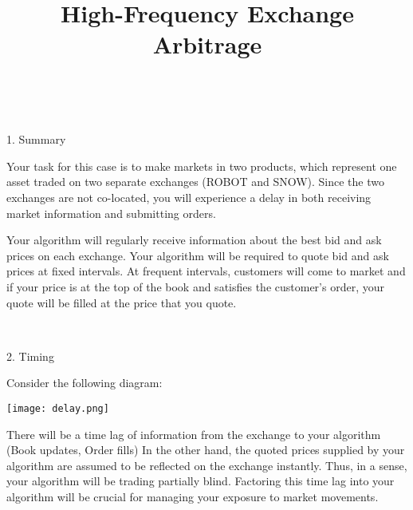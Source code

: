 \documentclass[12pt]{article}
\title{High-Frequency Exchange Arbitrage}
\date{}
\begin{document}
\maketitle
\ \\
\begin{center}1. Summary\end{center}
Your task for this case is to make markets in two products, which represent one asset traded on two separate exchanges (ROBOT and SNOW). Since the two exchanges are not co-located, you will experience a delay in both receiving market information and submitting orders. 

Your algorithm will regularly receive information about the best bid and ask prices on each exchange. Your algorithm will be required to quote bid and ask prices at fixed intervals. At frequent intervals, customers will come to market and if your price is at the top of the book and satisfies the customer’s order, your quote will be filled at the price that you quote.

\ \\
\begin{center}2. Timing\end{center}
Consider the following diagram: \\
  \begin{center}
    \texttt{[image: delay.png]}
  \end{center}
There will be a time lag of information from the exchange to your algorithm (Book updates, Order fills) In the other hand, the quoted prices supplied by your algorithm are assumed to be reflected on the exchange instantly. Thus, in a sense, your algorithm will be trading partially blind. Factoring this time lag into your algorithm will be crucial for managing your exposure to market movements.
\end{document}
